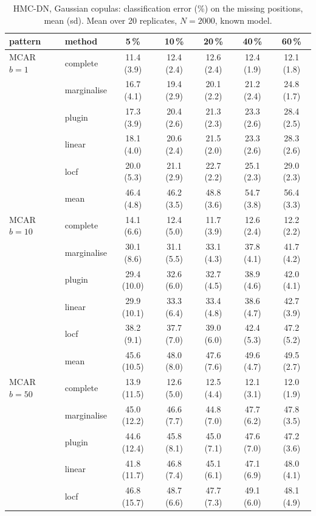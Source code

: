 \begin{table}[htbp]
  \centering
  \small
  \setlength{\tabcolsep}{4pt}
  \caption{HMC-DN, Gaussian copulas: classification error (\%) on the missing positions, mean (sd). Mean over 20 replicates, $N = 2000$, known model.}
  \label{tab:missing-err-hmc_dn_gauss_k2}
  \begin{tabular}{llccccc}
    \toprule
    pattern & method & 5\,\% & 10\,\% & 20\,\% & 40\,\% & 60\,\% \\
    \midrule
    MCAR $b{=}1$ & complete & 11.4 (3.9) & 12.4 (2.4) & 12.6 (2.4) & 12.4 (1.9) & 12.1 (1.8) \\
     & marginalise & 16.7 (4.1) & 19.4 (2.9) & 20.1 (2.2) & 21.2 (2.4) & 24.8 (1.7) \\
     & plugin & 17.3 (3.9) & 20.4 (2.6) & 21.3 (2.3) & 23.3 (2.6) & 28.4 (2.5) \\
     & linear & 18.1 (4.0) & 20.6 (2.4) & 21.5 (2.0) & 23.3 (2.6) & 28.3 (2.6) \\
     & locf & 20.0 (5.3) & 21.1 (2.9) & 22.7 (2.2) & 25.1 (2.3) & 29.0 (2.3) \\
     & mean & 46.4 (4.8) & 46.2 (3.5) & 48.8 (3.6) & 54.7 (3.8) & 56.4 (3.3) \\
    \addlinespace
    MCAR $b{=}10$ & complete & 14.1 (6.6) & 12.4 (5.0) & 11.7 (3.9) & 12.6 (2.4) & 12.2 (2.2) \\
     & marginalise & 30.1 (8.6) & 31.1 (5.5) & 33.1 (4.3) & 37.8 (4.1) & 41.7 (4.2) \\
     & plugin & 29.4 (10.0) & 32.6 (6.0) & 32.7 (4.5) & 38.9 (4.6) & 42.0 (4.1) \\
     & linear & 29.9 (10.1) & 33.3 (6.4) & 33.4 (4.8) & 38.6 (4.7) & 42.7 (3.9) \\
     & locf & 38.2 (9.1) & 37.7 (7.0) & 39.0 (6.0) & 42.4 (5.3) & 47.2 (5.2) \\
     & mean & 45.6 (10.5) & 48.0 (8.0) & 47.6 (7.6) & 49.6 (4.7) & 49.5 (2.7) \\
    \addlinespace
    MCAR $b{=}50$ & complete & 13.9 (11.5) & 12.6 (5.0) & 12.5 (4.4) & 12.1 (3.1) & 12.0 (1.9) \\
     & marginalise & 45.0 (12.2) & 46.6 (7.7) & 44.8 (7.0) & 47.7 (6.2) & 47.8 (3.5) \\
     & plugin & 44.6 (12.4) & 45.8 (8.1) & 45.0 (7.1) & 47.6 (7.0) & 47.2 (3.6) \\
     & linear & 41.8 (11.7) & 46.8 (7.4) & 45.1 (6.1) & 47.1 (6.9) & 48.0 (4.1) \\
     & locf & 46.8 (15.7) & 48.7 (6.6) & 47.7 (7.3) & 49.1 (6.0) & 48.1 (4.9) \\

\end{tabular}
\end{table}
